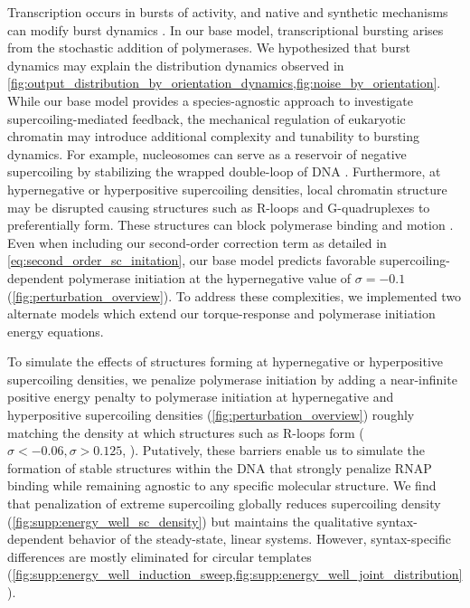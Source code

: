 \documentclass[11pt]{article} %
\begin{document}
Transcription occurs in bursts of activity, and native and synthetic mechanisms can modify burst dynamics \parencite{desaiDNArepairPathwayCan2021,chongMechanismTranscriptionalBursting2014,poppAlteringTranscriptionFactor2021}.
In our base model, transcriptional bursting arises from the stochastic addition of polymerases. We hypothesized that burst dynamics may explain the distribution dynamics observed in \cref{fig:output_distribution_by_orientation_dynamics,fig:noise_by_orientation}. While our base model provides a species-agnostic approach to investigate supercoiling-mediated feedback, the mechanical regulation of eukaryotic chromatin may introduce additional complexity and tunability to bursting dynamics. For example, nucleosomes can serve as a reservoir of negative supercoiling by stabilizing the wrapped double-loop of DNA \parencite{leSynergisticCoordinationChromatin2019}.
Furthermore, at hypernegative or hyperpositive supercoiling densities, local chromatin structure may be disrupted causing structures such as R-loops and G-quadruplexes to preferentially form. These structures can block polymerase binding and motion \parencite{stolzInterplayDNASequence2019}.
Even when including our second-order correction term as detailed in \cref{eq:second_order_sc_initation}, our base model predicts favorable supercoiling-dependent polymerase initiation at the hypernegative value of \(\sigma = -0.1\) (\cref{fig:perturbation_overview}). To address these complexities, we implemented two alternate models which extend our torque-response and polymerase initiation energy equations. 

To simulate the effects of structures forming at hypernegative or hyperpositive supercoiling densities, we penalize polymerase initiation by adding a near-infinite positive energy penalty to polymerase initiation at hypernegative and hyperpositive supercoiling densities (\cref{fig:perturbation_overview}) roughly matching the density at which structures such as R-loops form (\(\sigma < -0.06, \sigma > 0.125\), \parencite{stolzInterplayDNASequence2019}). Putatively, these barriers enable us to simulate the formation of stable structures within the DNA that strongly penalize RNAP binding while remaining agnostic to any specific molecular structure. We find that penalization of extreme supercoiling globally reduces supercoiling density (\cref{fig:supp:energy_well_sc_density}) but maintains the qualitative syntax-dependent behavior of the steady-state, linear systems. However, syntax-specific differences are mostly eliminated for circular templates (\cref{fig:supp:energy_well_induction_sweep,fig:supp:energy_well_joint_distribution}).
\end{document}

